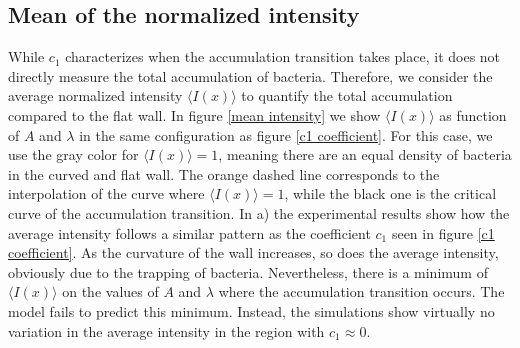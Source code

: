 
\subsection{Mean of the normalized intensity}

While $c_1$ characterizes when the accumulation transition takes place, it does not directly measure the total accumulation of bacteria. Therefore, we consider the average normalized intensity $\langle I(x) \rangle$ to quantify the total accumulation compared to the flat wall. In figure \ref{mean intensity} we show $\langle I(x) \rangle$ as function of $A$ and $\lambda$ in the same configuration as figure \ref{c1 coefficient}. For this case, we use the gray color for $\langle I(x) \rangle =1$, meaning there are an equal density of bacteria in the curved and flat wall. The orange dashed line corresponds to the interpolation of the curve where $\langle I(x) \rangle =1$, while the black one is the critical curve of the accumulation transition. In a) the experimental results show how the average intensity follows a similar pattern as the coefficient $c_1$ seen in figure \ref{c1 coefficient}. As the curvature of the wall increases, so does the average intensity, obviously due to the trapping of bacteria. Nevertheless, there is a minimum of $\langle I(x) \rangle$ on the values of $A$ and $\lambda$ where the accumulation transition occurs. The model fails to predict this minimum. Instead, the simulations show virtually no variation in the average intensity in the region with $c_1\approx0$. 

